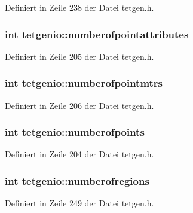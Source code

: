 Definiert in Zeile 238 der Datei tetgen.\-h.

\hypertarget{classtetgenio_a3d263e577de1fa81296abe9a6ba029b0}{
\subsubsection[{numberofpointattributes}]{\setlength{\rightskip}{0pt plus 5cm}int tetgenio\-::numberofpointattributes}}\label{classtetgenio_a3d263e577de1fa81296abe9a6ba029b0}


Definiert in Zeile 205 der Datei tetgen.\-h.

\hypertarget{classtetgenio_a1a62cf8c03758eb3e1920c6c506c1a64}{
\subsubsection[{numberofpointmtrs}]{\setlength{\rightskip}{0pt plus 5cm}int tetgenio\-::numberofpointmtrs}}\label{classtetgenio_a1a62cf8c03758eb3e1920c6c506c1a64}


Definiert in Zeile 206 der Datei tetgen.\-h.

\hypertarget{classtetgenio_a5211bec795ba870c01fadade4cd8670f}{
\subsubsection[{numberofpoints}]{\setlength{\rightskip}{0pt plus 5cm}int tetgenio\-::numberofpoints}}\label{classtetgenio_a5211bec795ba870c01fadade4cd8670f}


Definiert in Zeile 204 der Datei tetgen.\-h.

\hypertarget{classtetgenio_a0394c99b57c4412515183ada3c1d8951}{
\subsubsection[{numberofregions}]{\setlength{\rightskip}{0pt plus 5cm}int tetgenio\-::numberofregions}}\label{classtetgenio_a0394c99b57c4412515183ada3c1d8951}


Definiert in Zeile 249 der Datei tetgen.\-h.

